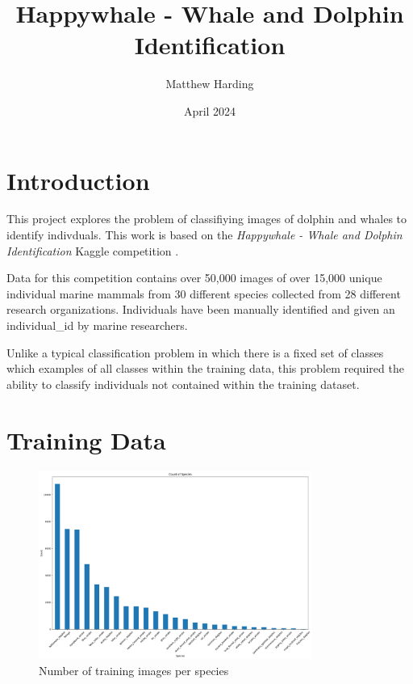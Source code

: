 \documentclass{article}
\title{Happywhale - Whale and Dolphin Identification}
\author{Matthew Harding}
\date{April 2024}
\begin{document}
\maketitle

\section{Introduction}
This project explores the problem of classifiying images of dolphin and whales to identify indivduals. This work 
is based on the \emph{Happywhale - Whale and Dolphin Identification} Kaggle competition \cite{kaggle_comp}.

Data for this competition contains over 50,000 images of over 15,000 unique individual marine mammals from 30 different species collected from 28 different research organizations. 
Individuals have been manually identified and given an individual\_id by marine researchers.

Unlike a typical classification problem in which there is a fixed set of classes which examples of all classes within the training data, this problem required the ability to classify individuals not contained within the training dataset.

\section{Training Data}

\begin{figure}[!htb]
    \centering
    \includegraphics[width=0.8\textwidth]{species_histogram.png}
    \caption{Number of training images per species}
    \label{fig:species_count_histogram}
\end{figure}
\end{document}
